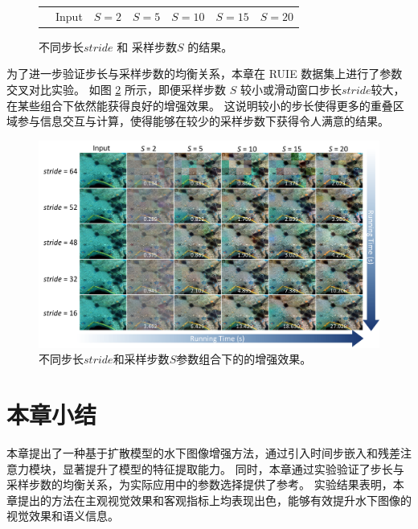 \begin{figure}[ht]
\begin{center}
\begin{tabular}{ccccccc}
            \multicolumn{1}{c}{} & \small Input & \hspace{-0.36cm} \small $S=2$ & \hspace{-0.36cm} \small $S=5$ & \hspace{-0.36cm} \small $S=10$ & \hspace{-0.36cm} \small $S=15$ & \hspace{-0.36cm} \small $S=20$ \\
        \end{tabular}
    \end{center}
    \vspace{-6mm}
    \caption{\label{img:stride-S} 不同步长$stride$ 和 采样步数$S$ 的结果。}
    \vspace{-4mm}
\end{figure}

为了进一步验证步长与采样步数的均衡关系，本章在 RUIE \cite{RUIE} 数据集上进行了参数交叉对比实验。
如图 \ref{img:param} 所示，即便采样步数 $S$ 较小或滑动窗口步长$stride$较大，在某些组合下依然能获得良好的增强效果。
这说明较小的步长使得更多的重叠区域参与信息交互与计算，使得能够在较少的采样步数下获得令人满意的结果。
\begin{figure}[t]
    \centering
    \includegraphics[width=0.98\linewidth]{figures/ch3/compare/discussion/param.pdf}
    \caption{\label{img:param}不同步长$stride$和采样步数$S$参数组合下的的增强效果。}
\end{figure}

\section{本章小结}
本章提出了一种基于扩散模型的水下图像增强方法，通过引入时间步嵌入和残差注意力模块，显著提升了模型的特征提取能力。
同时，本章通过实验验证了步长与采样步数的均衡关系，为实际应用中的参数选择提供了参考。
实验结果表明，本章提出的方法在主观视觉效果和客观指标上均表现出色，能够有效提升水下图像的视觉效果和语义信息。


